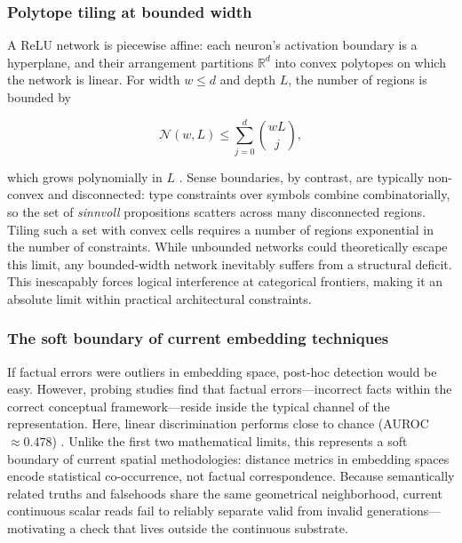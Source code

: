 \documentclass{article}
\begin{document}
\hypertarget{polytope-tiling-at-bounded-width}{%
\subsubsection{Polytope tiling at bounded
width}\label{polytope-tiling-at-bounded-width}}

A ReLU network is piecewise affine: each neuron's activation boundary is
a hyperplane, and their arrangement partitions \(\mathbb{R}^d\) into
convex polytopes on which the network is linear. For width \(w \le d\)
and depth \(L\), the number of regions is bounded by

\[\mathcal{N}(w, L) \le \sum_{j=0}^{d} \binom{wL}{j},\]

which grows polynomially in \(L\) \citep{hanin2017universal}. Sense
boundaries, by contrast, are typically non-convex and disconnected: type
constraints over symbols combine combinatorially, so the set of
\emph{sinnvoll} propositions scatters across many disconnected regions.
Tiling such a set with convex cells requires a number of regions
exponential in the number of constraints. While unbounded networks could
theoretically escape this limit, any bounded-width network inevitably
suffers from a structural deficit. This inescapably forces logical
interference at categorical frontiers, making it an absolute limit
within practical architectural constraints.

\hypertarget{the-soft-boundary-of-current-embedding-techniques}{%
\subsubsection{The soft boundary of current embedding
techniques}\label{the-soft-boundary-of-current-embedding-techniques}}

If factual errors were outliers in embedding space, post-hoc detection
would be easy. However, probing studies find that factual
errors---incorrect facts within the correct conceptual
framework---reside inside the typical channel of the representation.
Here, linear discrimination performs close to chance (AUROC
\(\approx 0.478\)) \citep{wei2024measuring}. Unlike the first two
mathematical limits, this represents a soft boundary of current spatial
methodologies: distance metrics in embedding spaces encode statistical
co-occurrence, not factual correspondence. Because semantically related
truths and falsehoods share the same geometrical neighborhood, current
continuous scalar reads fail to reliably separate valid from invalid
generations---motivating a check that lives outside the continuous
substrate.
\end{document}
